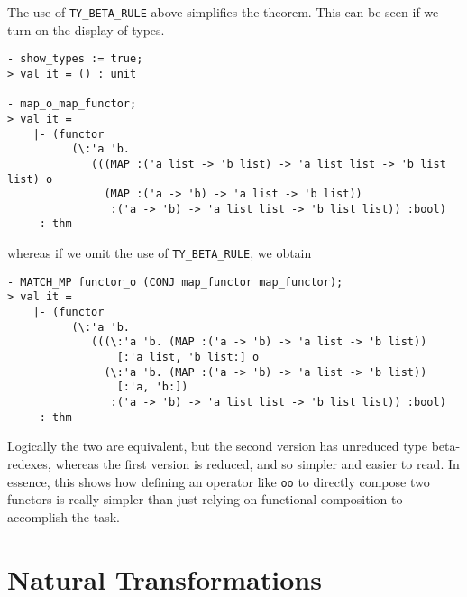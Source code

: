 The use of \texttt{TY\_BETA\_RULE} above simplifies the theorem. This can be seen
if we turn on the display of types.
\begin{session}
\begin{verbatim}
- show_types := true;
> val it = () : unit

- map_o_map_functor;
> val it =
    |- (functor
          (\:'a 'b.
             (((MAP :('a list -> 'b list) -> 'a list list -> 'b list list) o
               (MAP :('a -> 'b) -> 'a list -> 'b list))
                :('a -> 'b) -> 'a list list -> 'b list list)) :bool)
     : thm
\end{verbatim}
\end{session}
whereas if we omit the use of \texttt{TY\_BETA\_RULE}, we obtain
\begin{session}
\begin{verbatim}
- MATCH_MP functor_o (CONJ map_functor map_functor);
> val it =
    |- (functor
          (\:'a 'b.
             (((\:'a 'b. (MAP :('a -> 'b) -> 'a list -> 'b list))
                 [:'a list, 'b list:] o
               (\:'a 'b. (MAP :('a -> 'b) -> 'a list -> 'b list))
                 [:'a, 'b:])
                :('a -> 'b) -> 'a list list -> 'b list list)) :bool)
     : thm
\end{verbatim}
\end{session}
Logically the two are equivalent, but the second version has unreduced type
beta-redexes, whereas the first version is reduced, and so simpler and easier to read.
In essence, this shows how defining an operator like \texttt{oo} to directly compose
two functors is really simpler than just relying on functional composition to
accomplish the task.


\section{Natural Transformations}

